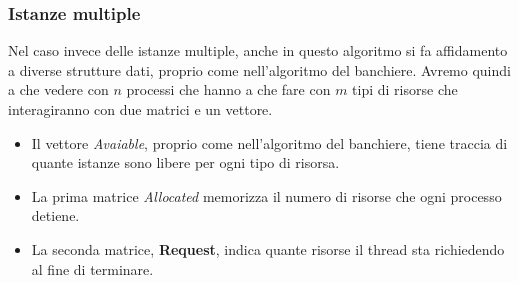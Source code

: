 \subsubsection{Istanze multiple}
Nel caso invece delle istanze multiple, anche in questo algoritmo si fa affidamento a diverse strutture dati, proprio come nell'algoritmo del banchiere. Avremo quindi a che vedere con $n$ processi che hanno a che fare con $m$ tipi di risorse che interagiranno con due matrici e un vettore.
\vspace{-5px}
\begin{itemize}
\setlength{\itemsep}{-.15 em}
    \item Il vettore \textit{Avaiable}, proprio come nell'algoritmo del banchiere, tiene traccia di quante istanze sono libere per ogni tipo di risorsa.
    \item La prima matrice \textit{Allocated} memorizza il numero di risorse che ogni processo detiene.
    \item La seconda matrice, \textbf{Request}, indica quante risorse il thread sta richiedendo al fine di terminare.
\end{itemize}

